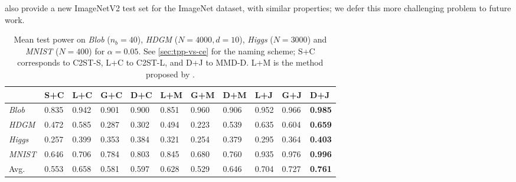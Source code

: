 \documentclass{article}
\begin{document}
\citet{recht:imagenet} also provide a new ImageNetV2 test set for the ImageNet dataset, with similar properties;
we defer this more challenging problem to future work.



















\begin{table*}[!t]
  \centering
  \footnotesize
  \caption{Mean test power on \emph{Blob} ($n_b=40$), \emph{HDGM} ($N=4000,d=10$), \emph{Higgs} ($N=3000$) and \emph{MNIST} ($N=400$) for $\alpha=0.05$.  See \cref{sec:tpp-vs-ce} for the naming scheme; S+C corresponds to C2ST-S, L+C to C2ST-L, and D+J to MMD-D.
  L+M is the method proposed by \citet{Matthias:deep-test}.
}\label{tab:CE_for_TST}
  \vspace{1mm}
    \begin{tabular}{lllllllllll}
    \toprule
& S+C & L+C & G+C & D+C & L+M & G+M & D+M & L+J & G+J & D+J \\
    \midrule
    \emph{Blob} 
& 0.835 & 0.942 & 0.901
    & 0.900
    & 0.851
    & 0.960
    & 0.906
    & 0.952 & 0.966 & {\bf 0.985} \\
    \emph{HDGM} 
& 0.472 & 0.585 & 0.287
    & 0.302
    & 0.494
    & 0.223
    & 0.539
    & 0.635 & 0.604 & {\bf 0.659} \\
\emph{Higgs}
    & 0.257 & 0.399 & 0.353
    & 0.384
    & 0.321
    & 0.254
    & 0.379
    & 0.295 & 0.364 & {\bf 0.403} \\
    \emph{MNIST}
& 0.646 & 0.706 & 0.784
    & 0.803
    & 0.845
    & 0.680
    & 0.760
    & 0.935 & 0.976 & {\bf 0.996} \\
    \midrule
    Avg.         & 0.553 & 0.658 & 0.581
    & 0.597
    & 0.628
    & 0.529
    & 0.646
    & 0.704 & 0.727 & {\bf 0.761} \\
    \bottomrule
    \end{tabular}\vspace{-1em}
\end{table*}
\end{document}
